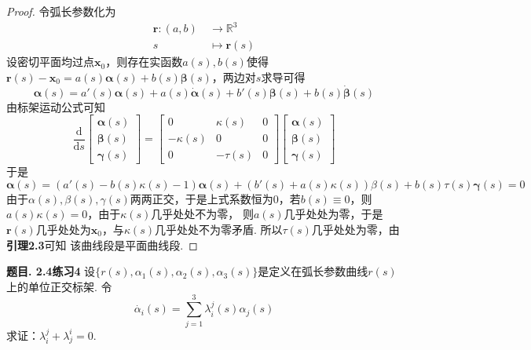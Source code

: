 \documentclass[12pt, a4paper, oneside]{ctexart}
\newcounter{problem}  %
\newenvironment{problem}[1][]{\stepcounter{problem}\par\noindent\textbf{题目\arabic{problem}. #1}}{\smallskip\par}
\def\bd{\boldsymbol}        %
\def\R{\mathbb{R}}          %
\def\d{\mathrm{d}}          %
\begin{document}
\begin{proof}
    令弧长参数化为
    \begin{equation*}
    \begin{aligned}
        \bd{r}:(a,b)&\ \to \R^3\\
        s&\ \mapsto \bd{r}(s)
    \end{aligned}
    \end{equation*}
    设密切平面均过点$\bd{x}_0$，则存在实函数$a(s),b(s)$使得$\bd{r}(s) - \bd{x}_0 = a(s)\bd{\alpha}(s)+b(s)\bd{\beta}(s)$，两边对$s$求导可得
    \begin{equation*}
        \bd{\alpha}(s) = a'(s)\bd{\alpha}(s) + a(s)\dot{\bd{\alpha}}(s) + b'(s)\bd{\beta}(s) + b(s)\dot{\bd{\beta}}(s)
    \end{equation*}
    由标架运动公式可知
    \begin{equation*}
        \frac{\d}{\d s}\begin{bmatrix}
            \bd{\alpha}(s)\\
            \bd{\beta}(s)\\
            \bd{\gamma}(s)
        \end{bmatrix} = \begin{bmatrix}
            0&\kappa(s)&0\\
            -\kappa(s)&0&0\\
            0&-\tau(s)&0
        \end{bmatrix}\begin{bmatrix}
            \bd{\alpha}(s)\\
            \bd{\beta}(s)\\
            \bd{\gamma}(s)
        \end{bmatrix}
    \end{equation*}
    于是
    \begin{equation*}
        \bd{\alpha}(s) = (a'(s) - b(s)\kappa(s)-1)\bd{\alpha}(s) + (b'(s)+a(s)\kappa(s))\beta(s) + b(s)\tau(s)\bd{\gamma}(s) = 0
    \end{equation*}
    由于$\alpha(s), \beta(s), \gamma(s)$两两正交，于是上式系数恒为$0$，若$b(s)\equiv 0$，则$a(s)\kappa(s) = 0$，由于$\kappa(s)$几乎处处不为零，
    则$a(s)$几乎处处为零，于是$\bd{r}(s)$几乎处处为$\bd{x}_0$，与$\kappa(s)$几乎处处不为零矛盾. 所以$\tau(s)$几乎处处为零，由\textbf{引理2.3}可知
    该曲线段是平面曲线段.
\end{proof}
\begin{problem}[2.4练习4]
    设$\{r(s),\alpha_1(s),\alpha_2(s),\alpha_3(s)\}$是定义在弧长参数曲线$r(s)$上的单位正交标架. 令
    \begin{equation*}
        \dot{\alpha_i}(s) = \sum_{j=1}^3\lambda_i^j(s)\alpha_j(s)
    \end{equation*}
    求证：$\lambda_i^j + \lambda_j^i = 0$.
\end{problem}
\end{document}
